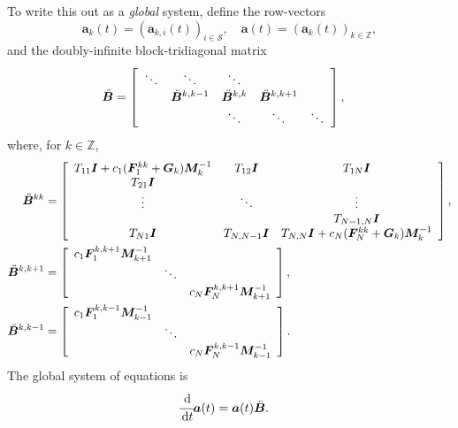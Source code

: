 
To write this out as a \textit{global} system, define the row-vectors 
\[\boldsymbol a_k(t) = (\boldsymbol a_{k,i}(t))_{i\in\mathcal S},\quad \boldsymbol a(t) = (\boldsymbol a_k(t))_{k\in\mathbb Z},\]
and the doubly-infinite block-tridiagonal matrix 
\begin{align*}
\ddot{\boldsymbol B} &= \left[\begin{array}{ccccc}
	\ddots & \ddots & \ddots & & \\
	& \ddot{\boldsymbol B}^{k,k-1} & \ddot{\boldsymbol B}^{k,k} & \ddot{\boldsymbol B}^{k,k+1} & \\
	& & \ddots & \ddots & \ddots 
\end{array}\right],
\end{align*}
where, for \(k\in\mathbb Z\), 
\begin{align*}
    \ddot{{\boldsymbol B}}^{kk}&=\left[\begin{array}{ccc}T_{11}\boldsymbol I + c_1(\boldsymbol F_1^{kk}+\boldsymbol G_k)\boldsymbol M_k^{-1} & T_{12}\boldsymbol I & T_{1N}\boldsymbol I  \\ T_{21}\boldsymbol I & & \\ \vdots &\ddots & \vdots \\ & &   T_{N-1,N}\boldsymbol I \\  T_{N1}\boldsymbol I &  T_{N,N-1}\boldsymbol I & T_{N,N}\boldsymbol I +c_{N}(\boldsymbol F_{N}^{kk}+\boldsymbol G_k)\boldsymbol M_k^{-1}\end{array}\right],\\
	\ddot{{\boldsymbol B}}^{k,k+1}&=\left[\begin{array}{ccc}c_1\boldsymbol F_1^{k,k+1}\boldsymbol M_{k+1}^{-1}&  & \\  &\ddots & \\  &  &c_{N}\boldsymbol F_{N}^{k,k+1}\boldsymbol M_{k+1}^{-1} \end{array}\right],\\
	\ddot{{\boldsymbol B}}^{k,k-1}&=\left[\begin{array}{ccc}c_1\boldsymbol F_1^{k,k-1}\boldsymbol M_{k-1}^{-1}&  & \\  &\ddots &  \\  &  &c_{N}\boldsymbol F_{N}^{k,k-1}\boldsymbol M_{k-1}^{-1} \end{array}\right].
\end{align*} 
The global system of equations is 
\begin{align}\label{eqn:DG ODE}
	&\cfrac{\, \mathrm{d}}{\, \mathrm{d} t} \boldsymbol a(t) = \boldsymbol a(t){\ddot{{\boldsymbol B}}}.
\end{align}

